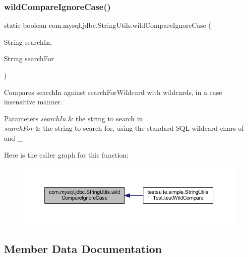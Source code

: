 \subsubsection{\texorpdfstring{wild\+Compare\+Ignore\+Case()}{wildCompareIgnoreCase()}}
{\footnotesize\ttfamily static boolean com.\+mysql.\+jdbc.\+String\+Utils.\+wild\+Compare\+Ignore\+Case (\begin{DoxyParamCaption}\item[{String}]{search\+In,  }\item[{String}]{search\+For }\end{DoxyParamCaption})\hspace{0.3cm}{\ttfamily [static]}}

Compares search\+In against search\+For\+Wildcard with wildcards, in a case insensitive manner.


\begin{DoxyParams}{Parameters}
{\em search\+In} & the string to search in \\
\hline
{\em search\+For} & the string to search for, using the \textquotesingle{}standard\textquotesingle{} S\+QL wildcard chars of \textquotesingle{}\textquotesingle{} and \textquotesingle{}\+\_\+\textquotesingle{} \\
\hline
\end{DoxyParams}
Here is the caller graph for this function\+:
\nopagebreak
\begin{figure}[H]
\begin{center}
\leavevmode
\includegraphics[width=350pt]{classcom_1_1mysql_1_1jdbc_1_1_string_utils_a20d8547a5e865d12bac8f9ef9ba00834_icgraph}
\end{center}
\end{figure}


\subsection{Member Data Documentation}
\mbox{\label{classcom_1_1mysql_1_1jdbc_1_1_string_utils_ae7d013953cfc589d4a336aae1cad3e15}} 
